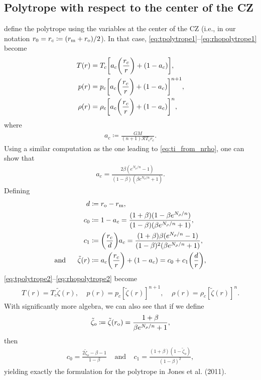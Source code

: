 \documentclass[12pt]{article} %
\newcommand{\rrm}{r_{\rm{m}}}
\newcommand{\andd}{\text{and}\ \ \ \ \ }
\newcommand{\tz}{\tilde{\zeta}}
\begin{document}
\subsection{Polytrope with respect to the center of the CZ}
\citet{Jones11} define the polytrope using the variables at the center of the CZ (i.e., in our notation $r_0=r_c\coloneqq(\rrm+r_{\rm{o}})/2$). In that case, \eqref{eq:tpolytrope1}--\eqref{eq:rhopolytrope1} become
\begin{align}
	T(r) &= T_c\bigg{[}a_c\bigg{(}\frac{r_c}{r}\bigg{)} + (1 - a_c)\bigg{]},\label{eq:tpolytrope2}\\
	p(r) &= p_c\bigg{[}a_c\bigg{(}\frac{r_c}{r}\bigg{)} + (1 - a_c)\bigg{]}^{n+1},\label{eq:ppolytrope2}\\
	\rho(r) &= \rho_c\bigg{[}a_c\bigg{(}\frac{r_c}{r}\bigg{)} + (1 - a_c)\bigg{]}^n,\label{eq:rhopolytrope2}
\end{align} 
where 
\begin{align}
a_c \coloneqq \frac{GM}{(n+1)\mathcal{R}T_c r_c}.
\label{def:ac}
\end{align}
Using a similar computation as the one leading to \eqref{eq:ti_from_nrho}, one can show that 
\begin{align}
a_c = \frac{2\beta(e^{N_\rho/n}-1)}{(1-\beta)(\beta e^{N_\rho/n} + 1)}.
\label{eq:ac_fromn}
\end{align}
Defining 
\begin{align}
d&\coloneqq r_{\rm{o}}-\rrm,\label{def:d}\\
c_0&\coloneqq 1-a_c = \frac{(1+\beta)(1-\beta e^{N_\rho/n})}{(1-\beta)(\beta e^{N_\rho/n} + 1)}, \label{def:c0}\\
c_1&\coloneqq \bigg{(}\frac{r_c}{d}\bigg{)}a_c = \frac{(1+\beta)\beta(e^{N_\rho/n}-1)}{(1-\beta)^2(\beta e^{N_\rho/n} + 1)},\label{def:c1}\\
\andd \tz(r) &\coloneqq a_c\bigg{(}\frac{r_c}{r}\bigg{)} + (1-a_c) = c_0 + c_1\bigg{(}\frac{d}{r}\bigg{)},\label{def:tildezeta}
\end{align}
\eqref{eq:tpolytrope2}--\eqref{eq:rhopolytrope2} become
\begin{align}
T(r)=T_c\tz(r),\ \ \ \ \ p(r)=p_c[\tz(r)]^{n+1},\ \ \ \ \ \rho(r)=\rho_c[\tz(r)]^n. 
\label{eq:polytrope3}
\end{align}
With significantly more algebra, we can also see that if we define
\begin{align}
\tz_o \coloneqq \tz(r_{\rm{o}}) = \frac{1+\beta}{\beta e^{N_\rho/n} + 1}, 
\end{align}
then 
\begin{align}
c_0 = \frac{2\tz_o - \beta - 1}{1-\beta} \ \ \ \ \ \andd c_1 = \frac{(1+\beta)(1-\tz_o)}{(1-\beta)^2},
\label{eq:c01_from_zeta0}
\end{align}
yielding exactly the formulation for the polytrope in Jones et al. (2011). 
\end{document}
